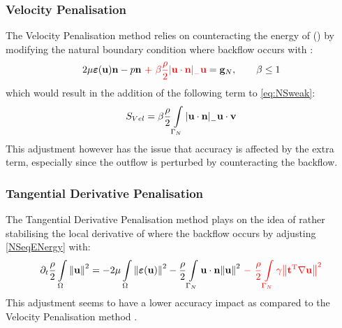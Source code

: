 \subsubsection{Velocity Penalisation}
The Velocity Penalisation method relies on counteracting the energy of ({\large \textasteriskcentered}) by modifying the natural boundary condition where backflow occurs with \cite{bertoglio2016}:
\begin{align}\label{eq:VeloPenal}
    2\mu\bm{\varepsilon} ({\textbf{u}}){\textbf{n}} - p{\bf n} ~{\color{red} + ~\beta\frac{\rho}{2}\abs{\bf{\textbf{u}}\cdot n}_{-}{\textbf{u}}} = {\bf g}_{N}, \qquad \beta \leq 1
\end{align}
which would result in the addition of the following term to \autoref{eq:NSweak}:
\begin{equation}
    S_{Vel} = \beta\frac{\rho}{2}\int\limits_{\Gamma_{N}}\abs{{\textbf{u}}\cdot{\textbf{n}}}_{-}{\textbf{u}}\cdot{\textbf{v}}
\end{equation}
This adjustment however has the issue that accuracy is affected by the extra term, especially since the outflow is perturbed by counteracting the backflow. 
\subsubsection{Tangential Derivative Penalisation}
The Tangential Derivative Penalisation method plays on the idea of rather stabilising the local derivative of where the backflow occurs by adjusting \autoref{NSeqENergy} with:  
\begin{align}\label{eq:TangPenal}
\partial_t\frac{\rho}{2}\int\limits_{\Omega}\norm{{\textbf{u}}}^2 = -2\mu\int\limits_{\Omega}\norm{\bm{\varepsilon}({\textbf{u}})}^2 - \frac{\rho}{2}\int\limits_{\Gamma_{N}}{\textbf{u}}\cdot{\textbf{n}}\norm{{\textbf{u}}}^2 ~{\color{red}- ~\frac{\rho}{2}\int\limits_{\Gamma_{N}}\gamma\norm{{\bf t^{\text{T}}\nabla}{\textbf{u}}}^2}
\end{align}
This adjustment seems to have a lower accuracy impact as compared to the Velocity Penalisation method \cite{bertoglio2017}. 

